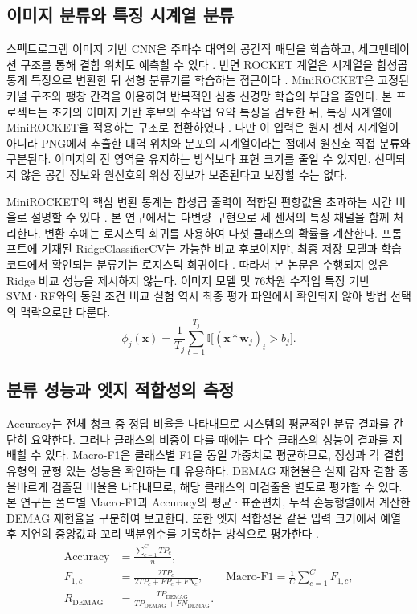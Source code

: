 \documentclass[11pt,a4paper]{article}
\newcommand{\sourceproject}{\citep{project2026}}
\begin{document}
\subsection{이미지 분류와 특징 시계열 분류}
스펙트로그램 이미지 기반 CNN은 주파수 대역의 공간적 패턴을 학습하고, 세그멘테이션 구조를 통해 결함 위치도 예측할 수 있다 \citep{park2024}.
반면 ROCKET 계열은 시계열을 합성곱 통계 특징으로 변환한 뒤 선형 분류기를 학습하는 접근이다 \citep{minirocket2021}.
MiniROCKET은 고정된 커널 구조와 팽창 간격을 이용하여 반복적인 심층 신경망 학습의 부담을 줄인다.
본 프로젝트는 초기의 이미지 기반 후보와 수작업 요약 특징을 검토한 뒤, 특징 시계열에 MiniROCKET을 적용하는 구조로 전환하였다 \sourceproject.
다만 이 입력은 원시 센서 시계열이 아니라 PNG에서 추출한 대역 위치와 분포의 시계열이라는 점에서 원신호 직접 분류와 구분된다.
이미지의 전 영역을 유지하는 방식보다 표현 크기를 줄일 수 있지만, 선택되지 않은 공간 정보와 원신호의 위상 정보가 보존된다고 보장할 수는 없다.

MiniROCKET의 핵심 변환 통계는 합성곱 출력이 적합된 편향값을 초과하는 시간 비율로 설명할 수 있다 \citep{minirocket2021}.
본 연구에서는 다변량 구현으로 세 센서의 특징 채널을 함께 처리한다.
변환 후에는 로지스틱 회귀를 사용하여 다섯 클래스의 확률을 계산한다.
프롬프트에 기재된 RidgeClassifierCV는 가능한 비교 후보이지만, 최종 저장 모델과 학습 코드에서 확인되는 분류기는 로지스틱 회귀이다 \sourceproject.
따라서 본 논문은 수행되지 않은 Ridge 비교 성능을 제시하지 않는다.
이미지 모델 및 76차원 수작업 특징 기반 SVM·RF와의 동일 조건 비교 실험 역시 최종 평가 파일에서 확인되지 않아 방법 선택의 맥락으로만 다룬다.
\begin{equation}
 \phi_j(\mathbf{x})=\frac{1}{T_j}\sum_{t=1}^{T_j}
 \mathbb{I}\big[(\mathbf{x}*\mathbf{w}_j)_t>b_j\big].
 \label{eq:ppv}
\end{equation}

\subsection{분류 성능과 엣지 적합성의 측정}
Accuracy는 전체 청크 중 정답 비율을 나타내므로 시스템의 평균적인 분류 결과를 간단히 요약한다.
그러나 클래스의 비중이 다를 때에는 다수 클래스의 성능이 결과를 지배할 수 있다.
Macro-F1은 클래스별 F1을 동일 가중치로 평균하므로, 정상과 각 결함 유형의 균형 있는 성능을 확인하는 데 유용하다.
DEMAG 재현율은 실제 감자 결함 중 올바르게 검출된 비율을 나타내므로, 해당 클래스의 미검출을 별도로 평가할 수 있다.
본 연구는 폴드별 Macro-F1과 Accuracy의 평균·표준편차, 누적 혼동행렬에서 계산한 DEMAG 재현율을 구분하여 보고한다.
또한 엣지 적합성은 같은 입력 크기에서 예열 후 지연의 중앙값과 꼬리 백분위수를 기록하는 방식으로 평가한다 \sourceproject.
\begin{align}
 \mathrm{Accuracy}&=\frac{\sum_{c=1}^{C}TP_c}{n},\\
 F_{1,c}&=\frac{2TP_c}{2TP_c+FP_c+FN_c},\qquad
 \mathrm{Macro\!\text{-}\!F1}=\frac{1}{C}\sum_{c=1}^{C}F_{1,c},\\
 R_{\mathrm{DEMAG}}&=\frac{TP_{\mathrm{DEMAG}}}{TP_{\mathrm{DEMAG}}+FN_{\mathrm{DEMAG}}}.
\end{align}
\end{document}
